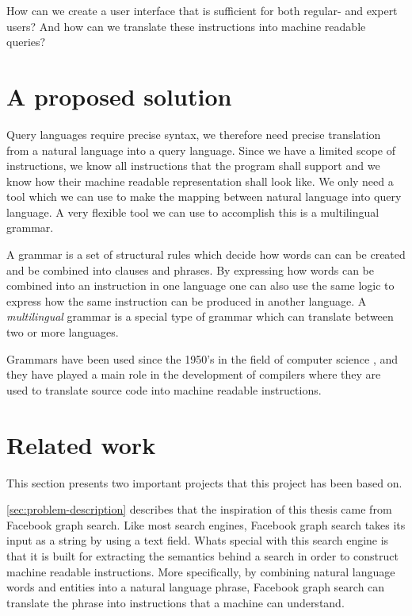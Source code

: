 How can we create a user interface that is sufficient for both regular- and expert users? And how can we translate these instructions into machine readable queries?

\section{A proposed solution}
Query languages require precise syntax, we therefore need precise translation from a natural language into a query language. Since we have a limited scope of instructions, we know all instructions that the program shall support and we know how their machine readable representation shall look like. We only need a tool which we can use to make the mapping between natural language into query language. A very flexible tool we can use to accomplish this is a multilingual grammar. \cite{citation-needed}

A grammar is a set of structural rules which decide how words can can be created and be combined into clauses and phrases. By expressing how words can be combined into an instruction in one language one can also use the same logic to express how the same instruction can be produced in another language. A \emph{multilingual} grammar is a special type of grammar which can translate between two or more languages. \cite{citation-needed}

Grammars have been used since the 1950's in the field of computer science \cite[p. 4]{ranta:2011}, and they have played a main role in the development of compilers where they are used to translate source code into machine readable instructions.

\section{Related work}
This section presents two important projects that this project has been based on.

\autoref{sec:problem-description} describes that the inspiration of this thesis came from Facebook graph search. \cite{citation-needed} Like most search engines, Facebook graph search takes its input as a string by using a text field. Whats special with this search engine is that it is built for extracting the semantics behind a search in order to construct machine readable instructions. More specifically, by combining natural language words and entities into a natural language phrase, Facebook graph search can translate the phrase into instructions that a machine can understand.

